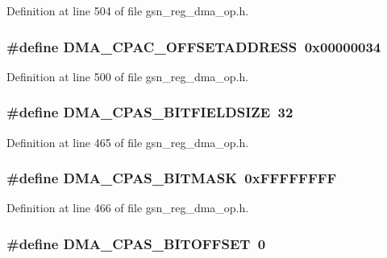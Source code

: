 Definition at line 504 of file gsn\_\-reg\_\-dma\_\-op.h.

\hypertarget{a00547_a15aa12f396c9727bab38b98cae8dccdd}{
\subsubsection[{DMA\_\-CPAC\_\-OFFSETADDRESS}]{\setlength{\rightskip}{0pt plus 5cm}\#define DMA\_\-CPAC\_\-OFFSETADDRESS~0x00000034}}
\label{a00547_a15aa12f396c9727bab38b98cae8dccdd}


Definition at line 500 of file gsn\_\-reg\_\-dma\_\-op.h.

\hypertarget{a00547_a6a4be6421656f9441bcfc4f13c592ccb}{
\subsubsection[{DMA\_\-CPAS\_\-BITFIELDSIZE}]{\setlength{\rightskip}{0pt plus 5cm}\#define DMA\_\-CPAS\_\-BITFIELDSIZE~32}}
\label{a00547_a6a4be6421656f9441bcfc4f13c592ccb}


Definition at line 465 of file gsn\_\-reg\_\-dma\_\-op.h.

\hypertarget{a00547_aa581767bbc03109ac7c77e8dc94bdbeb}{
\subsubsection[{DMA\_\-CPAS\_\-BITMASK}]{\setlength{\rightskip}{0pt plus 5cm}\#define DMA\_\-CPAS\_\-BITMASK~0xFFFFFFFF}}
\label{a00547_aa581767bbc03109ac7c77e8dc94bdbeb}


Definition at line 466 of file gsn\_\-reg\_\-dma\_\-op.h.

\hypertarget{a00547_af28721122278e380bce65f3eccafca96}{
\subsubsection[{DMA\_\-CPAS\_\-BITOFFSET}]{\setlength{\rightskip}{0pt plus 5cm}\#define DMA\_\-CPAS\_\-BITOFFSET~0}}
\label{a00547_af28721122278e380bce65f3eccafca96}


